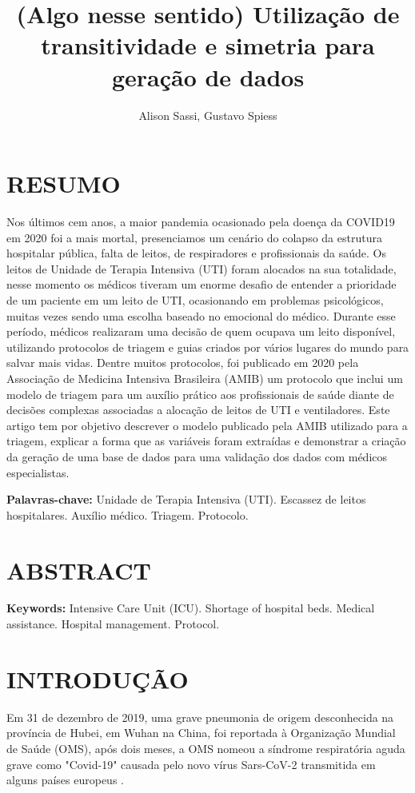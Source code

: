 \documentclass[12pt]{article}
\title{(Algo nesse sentido) Utilização de transitividade e simetria para geração de dados}
\author{Alison Sassi\inst{1}, Gustavo Spiess\inst{2} }
\begin{document}
 

\maketitle

\section{RESUMO}

Nos últimos cem anos, a maior pandemia ocasionado pela doença da COVID19 em 2020 foi a mais mortal, presenciamos um cenário do colapso da estrutura hospitalar pública, falta de leitos, de respiradores e profissionais da saúde. Os leitos de Unidade de Terapia Intensiva (UTI) foram alocados na sua totalidade, nesse momento os médicos tiveram um enorme desafio de entender a prioridade de um paciente em um leito de UTI, ocasionando em problemas psicológicos, muitas vezes sendo uma escolha baseado no emocional do médico. Durante esse período, médicos realizaram uma decisão de quem ocupava um leito disponível, utilizando protocolos de triagem e guias criados por vários lugares do mundo para salvar mais vidas. Dentre muitos protocolos, foi publicado em 2020 pela Associação de Medicina Intensiva Brasileira (AMIB) um protocolo que inclui um modelo de triagem para um auxílio prático aos profissionais de saúde diante de decisões complexas associadas a alocação de leitos de UTI e ventiladores. Este artigo tem por objetivo descrever o modelo publicado pela AMIB utilizado para a triagem, explicar a forma que as variáveis foram extraídas e demonstrar a criação da geração de uma base de dados para uma validação dos dados com médicos especialistas.

\textbf{Palavras-chave:} Unidade de Terapia Intensiva (UTI). Escassez de leitos hospitalares. Auxílio médico. Triagem. Protocolo.

\section{ABSTRACT}

\textbf{Keywords:} Intensive Care Unit (ICU). Shortage of hospital beds. Medical assistance. Hospital management. Protocol.

\section{INTRODUÇÃO}

Em 31 de dezembro de 2019, uma grave pneumonia de origem desconhecida na província de Hubei, em Wuhan na China, foi reportada à Organização Mundial de Saúde (OMS), após dois meses, a OMS nomeou a síndrome respiratória aguda grave como "Covid-19" causada pelo novo vírus Sars-CoV-2 transmitida em alguns países europeus \cite{sa2020especial}.
\end{document}
